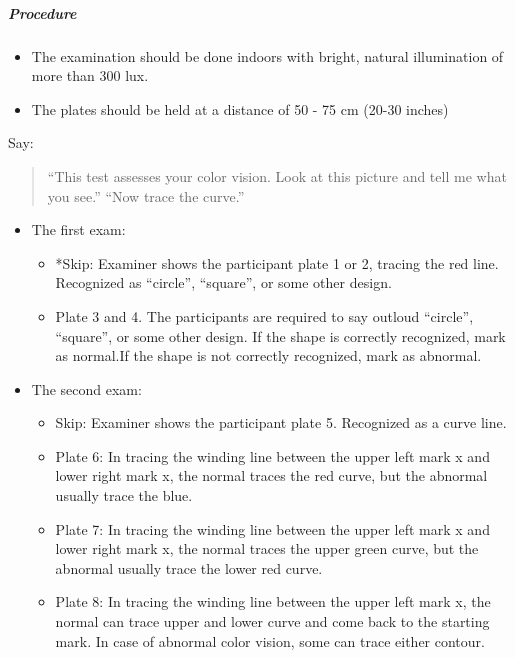 \documentclass[]{article}
\providecommand{\tightlist}{%
  \setlength{\itemsep}{0pt}\setlength{\parskip}{0pt}}
\let\oldsubparagraph\subparagraph
\renewcommand{\subparagraph}[1]{\oldsubparagraph{#1}\mbox{}}
\begin{document}
\subparagraph{Procedure}\label{procedure-1}

\begin{itemize}
\tightlist
\item
  The examination should be done indoors with bright, natural
  illumination of more than 300 lux.
\item
  The plates should be held at a distance of 50 - 75 cm (20-30 inches)
\end{itemize}

Say:

\begin{quote}
``This test assesses your color vision. Look at this picture and tell me
what you see.'' ``Now trace the curve.''
\end{quote}

\begin{itemize}
\tightlist
\item
  The first exam:

  \begin{itemize}
  \tightlist
  \item
    *Skip: Examiner shows the participant plate 1 or 2, tracing the red
    line. Recognized as ``circle'', ``square'', or some other design.
  \item
    Plate 3 and 4. The participants are required to say outloud
    ``circle'', ``square'', or some other design. If the shape is
    correctly recognized, mark as normal.If the shape is not correctly
    recognized, mark as abnormal.
  \end{itemize}
\item
  The second exam:

  \begin{itemize}
  \tightlist
  \item
    Skip: Examiner shows the participant plate 5. Recognized as a curve
    line.
  \item
    Plate 6: In tracing the winding line between the upper left mark x
    and lower right mark x, the normal traces the red curve, but the
    abnormal usually trace the blue.
  \item
    Plate 7: In tracing the winding line between the upper left mark x
    and lower right mark x, the normal traces the upper green curve, but
    the abnormal usually trace the lower red curve.
  \item
    Plate 8: In tracing the winding line between the upper left mark x,
    the normal can trace upper and lower curve and come back to the
    starting mark. In case of abnormal color vision, some can trace
    either contour.
  \end{itemize}
\end{itemize}
\end{document}
